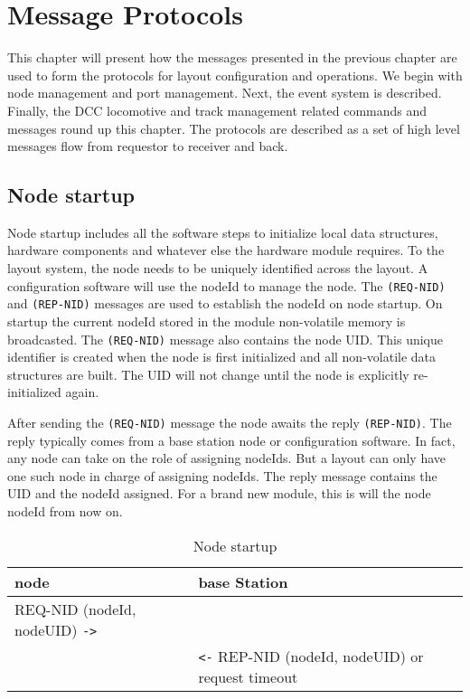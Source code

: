 \chapter{Message Protocols}

This chapter will present how the messages presented in the previous chapter are used to form the protocols for layout configuration and operations. We begin with node management and port management. Next, the event system is described. Finally, the DCC locomotive and track management related commands and messages round up this chapter. The protocols are described as a set of high level messages flow from requestor to receiver and back.

\section{Node startup}

Node startup includes all the software steps to initialize local data structures, hardware components and whatever else the hardware module requires. To the layout system, the node needs to be uniquely identified across the layout. A configuration software will use the nodeId to manage the node. The \texttt{(REQ-NID)} and \texttt{(REP-NID)} messages are used to establish the nodeId on node startup. On startup the current nodeId stored in the module non-volatile memory is broadcasted. The \texttt{(REQ-NID)} message also contains the node UID. This unique identifier is created when the node is first initialized and all non-volatile data structures are built. The UID will not change until the node is explicitly re-initialized again.

After sending the \texttt{(REQ-NID)} message the node awaits the reply \texttt{(REP-NID)}. The reply typically comes from a base station node or configuration software. In fact, any node can take on the role of assigning nodeIds. But a layout can only have one such node in charge of assigning nodeIds. The reply message contains the UID and the nodeId assigned. For a brand new module, this is will the node nodeId from now on.

\begin{table}[ht!]
    \centering
    \caption{Node startup}
    \begin{tabular}{|p{}|p{}|}
        \toprule
        \textbf{node} & \textbf{base Station} \\
        \midrule
        REQ-NID (nodeId, nodeUID) \texttt{->} & \\
        & \texttt{<-} REP-NID (nodeId, nodeUID) or request timeout \\
        \bottomrule
    \end{tabular}
\end{table}

